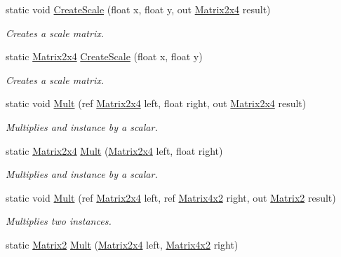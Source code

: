 \begin{DoxyCompactItemize}
static void \hyperlink{struct_open_t_k_1_1_matrix2x4_a37792931a8ebaa73a2082913807354da}{Create\-Scale} (float x, float y, out \hyperlink{struct_open_t_k_1_1_matrix2x4}{Matrix2x4} result)
\begin{DoxyCompactList}\small\item\em Creates a scale matrix. \end{DoxyCompactList}\item 
static \hyperlink{struct_open_t_k_1_1_matrix2x4}{Matrix2x4} \hyperlink{struct_open_t_k_1_1_matrix2x4_a940db96e798a38cff9c84b2019140bb7}{Create\-Scale} (float x, float y)
\begin{DoxyCompactList}\small\item\em Creates a scale matrix. \end{DoxyCompactList}\item 
static void \hyperlink{struct_open_t_k_1_1_matrix2x4_a48fb3819a5995c7bcaf4bd63cdf09613}{Mult} (ref \hyperlink{struct_open_t_k_1_1_matrix2x4}{Matrix2x4} left, float right, out \hyperlink{struct_open_t_k_1_1_matrix2x4}{Matrix2x4} result)
\begin{DoxyCompactList}\small\item\em Multiplies and instance by a scalar. \end{DoxyCompactList}\item 
static \hyperlink{struct_open_t_k_1_1_matrix2x4}{Matrix2x4} \hyperlink{struct_open_t_k_1_1_matrix2x4_a48e43cdea2dcd0eba08e3ad810d0aba6}{Mult} (\hyperlink{struct_open_t_k_1_1_matrix2x4}{Matrix2x4} left, float right)
\begin{DoxyCompactList}\small\item\em Multiplies and instance by a scalar. \end{DoxyCompactList}\item 
static void \hyperlink{struct_open_t_k_1_1_matrix2x4_a6df4e559f2588d9fa33db2d39db7333d}{Mult} (ref \hyperlink{struct_open_t_k_1_1_matrix2x4}{Matrix2x4} left, ref \hyperlink{struct_open_t_k_1_1_matrix4x2}{Matrix4x2} right, out \hyperlink{struct_open_t_k_1_1_matrix2}{Matrix2} result)
\begin{DoxyCompactList}\small\item\em Multiplies two instances. \end{DoxyCompactList}\item 
static \hyperlink{struct_open_t_k_1_1_matrix2}{Matrix2} \hyperlink{struct_open_t_k_1_1_matrix2x4_acbbe91f93fc59d64f3afbf01c0acaf38}{Mult} (\hyperlink{struct_open_t_k_1_1_matrix2x4}{Matrix2x4} left, \hyperlink{struct_open_t_k_1_1_matrix4x2}{Matrix4x2} right)

\end{DoxyCompactItemize}
